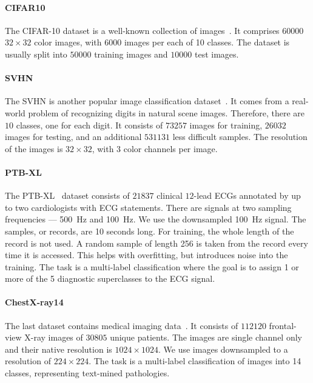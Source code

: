 \paragraph{CIFAR10}
The CIFAR-10 dataset is a well-known collection of images~\cite{krizhevsky2009learning}. It comprises $60000$ $32\times 32$ color images, with $6000$ images per each of 10 classes. The dataset is usually split into $50000$ training images and $10000$ test images.

\paragraph{SVHN}
The SVHN is another popular image classification dataset~\cite{netzer2011reading}. It comes from a real-world problem of recognizing digits in natural scene images. Therefore, there are $10$ classes, one for each digit. It consists of $73257$ images for training, $26032$ images for testing, and an additional $531131$ less difficult samples. The resolution of the images is $32\times 32$, with $3$ color channels per image.

\paragraph{PTB-XL}
 The PTB-XL~\cite{wagner2020ptb} dataset consists of $21837$ clinical $12$-lead ECGs annotated by up to two cardiologists with ECG statements. There are signals at two sampling frequencies --- \SI{500}{\hertz} and \SI{100}{\hertz}. We use the downsampled \SI{100}{\hertz} signal. The samples, or records, are 10 seconds long. For training, the whole length of the record is not used. A random sample of length 256 is taken from the record every time it is accessed. This helps with overfitting, but introduces noise into the training. The task is a multi-label classification where the goal is to assign 1 or more of the 5 diagnostic superclasses to the ECG signal.

\paragraph{ChestX-ray14}
The last dataset contains medical imaging data~\cite{wang2017chestx}. It consists of $112120$ frontal-view X-ray images of $30805$ unique patients. The images are single channel only and their native resolution is $1024\times 1024$. We use images downsampled to a resolution of $224\times 224$. The task is a multi-label classification of images into 14 classes, representing text-mined pathologies.


